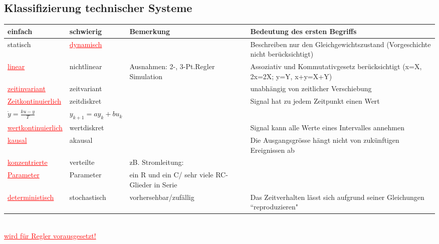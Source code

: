 		\subsection{Klassifizierung technischer Systeme}
		\begin{tabular}{|l|l|p{6cm}|p{6cm}|}
        	\hline
        	
        	einfach &
        	schwierig &
        	Bemerkung &
        	Bedeutung des \textbf{ersten} Begriffs\\
        	\hline
        	
        	statisch &
        	\textcolor{red}{\underline{dynamisch}} &
        	&
        	Beschreiben nur den Gleichgewichtszustand (Vorgeschichte nicht
        	berücksichtigt)\\
        	\hline
        	
        	\textcolor{red}{\underline{linear}}	&
        	nichtlinear &
        	Ausnahmen: 2-, 3-Pt.Regler Simulation &
        	Assoziativ und Kommutativgesetz berücksichtigt \newline (x=X, 2x=2X;
        	y=Y, x+y=X+Y)\\
        	\hline
        	
        	\textcolor{red}{\underline{zeitinvariant}} &
        	zeitvariant &
        	&
        	unabhängig von zeitlicher Verschiebung \\
        	\hline
        	
        	\textcolor{red}{\underline{Zeitkontinuierlich}} &
        	zeitdiskret &
        	&
        	Signal hat zu jedem Zeitpunkt einen Wert\\
        	$\dot{y}=\frac{ku-y}{T}$ &
        	$y_{k+1}=a y_k + b u_k$	&
        	&
        	\\
        	\hline
        	
        	\textcolor{red}{\underline{wertkontinuierlich}}&
        	wertdiskret&
        	&
        	Signal kann alle Werte eines Intervalles annehmen\\
        	\hline
        	
        	\textcolor{red}{\underline{kausal}}	&
        	akausal	&
        	&
        	Die Ausgangsgrösse hängt nicht von zukünftigen Ereignissen ab\\
        	\hline
        	
        	\textcolor{red}{\underline{konzentrierte}} &
        	verteilte &
        	zB.	Stromleitung: &
        	\\
        	\textcolor{red}{\underline{Parameter}} &
        	Parameter	&
        	ein R und ein C/ sehr viele RC-Glieder in Serie &
        	\\
        	\hline
        	
        	\textcolor{red}{\underline{deterministisch}}	&
        	stochastisch &
        	vorhersehbar/zufällig &
        	Das Zeitverhalten lässt sich aufgrund seiner Gleichungen
        	``reproduzieren"\\
        	\hline
        \end{tabular}\\
				\textcolor{red}{\underline{wird für Regler vorausgesetzt!}}
			
